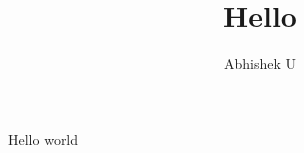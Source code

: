 \documentclass[10pt,a4paper]{article}
\author{Abhishek U}
\title{\pkg{texor} Hello}
\begin{document}
\maketitle
Hello world 
\end{document}
